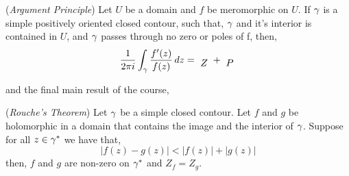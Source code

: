 \documentclass{article}
\begin{document}
\begin{nthm}{(\textit{Argument Principle})}
  Let $U$ be a domain and $f$ be meromorphic on $U$. If $\gamma$ is a simple positively oriented closed contour, such that, $\gamma$ and it's interior is contained in $U$, and $\gamma$ passes through no zero or poles of f, then,
  \begin{equation*}
  \frac{1}{2\pi i}\int_\g \frac{f'(z)}{f(z)}\,dz = \tikz[baseline]{\node(d4) {$Z$}} +  \tikz[baseline]{\node(d5){$P$}}
  \end{equation*}
  \vspace{1cm}\par
  \noindent\hfil{}
\end{nthm}

and the final main result of the course,

\begin{nthm}{(\textit{Rouche's Theorem})}
  Let $\gamma$ be a simple closed contour. Let $f$ and $g$ be holomorphic in a domain that contains the image and the interior of $\gamma$. Suppose for all $z \in \gamma^*$ we have that,
  $$ |f(z) - g(z)| < |f(z)| + |g(z)| $$
  then, $f$ and $g$ are non-zero on $\gamma^*$ and $Z_f = Z_g$.
\end{nthm}
\end{document}
